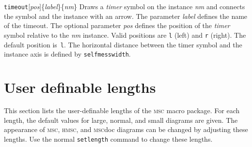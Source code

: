\documentclass[a4paper]{article}
\newcommand{\cmd}[1]{\texttt{\bslash #1}}
\newcommand{\acro}[1]{{\scshape\lowercase{#1}}}
\newcommand\MSC{\acro{MSC}}
\newcommand\HMSC{\acro{HMSC}}
\newcommand{\MSCdoc}{\MSC{}doc}
\newcommand{\mscpack}{\MSC{} macro package}
\newcommand{\opt}[1]{[#1]}
\newenvironment{defs}{%
  \begin{list}{}%
              {\setlength{\labelwidth}{0pt}%
               \setlength{\labelsep}{1em}%
               \setlength{\leftmargin}{1em}%
               \setlength{\parsep}{1ex}%
               \setlength{\listparindent}{0pt}%
               \setlength{\rightmargin}{0pt}%
               \renewcommand{\makelabel}[1]{##1}%
               \raggedright%
              }%
  }{%
  \end{list}}
\begin{document}
\begin{defs}
\item[\cmd{timeout}\opt{\emph{pos}}\{\emph{label}\}\{\emph{nm}\}]
Draws a \emph{timer} symbol on the instance \emph{nm} and connects the
symbol and the instance with an arrow. The parameter \emph{label}
defines the name of the timeout. The optional parameter \emph{pos}
defines the position of the \emph{timer} symbol relative to the
\emph{nm} instance. Valid positions are \verb|l| (left) and \verb|r|
(right). The default position is~\verb|l|. The horizontal distance
between the timer symbol and the instance axis is defined by
\verb+selfmesswidth+.

\end{defs}


\section{User definable lengths}

This section lists the user-definable lengths of the \mscpack. For
each length, the default values for large, normal, and small diagrams
are given. The appearance of \MSC, \HMSC, and \MSCdoc{} diagrams can be
changed by adjusting these lengths. Use the normal \cmd{setlength}
command to change these lengths.
\end{document}
